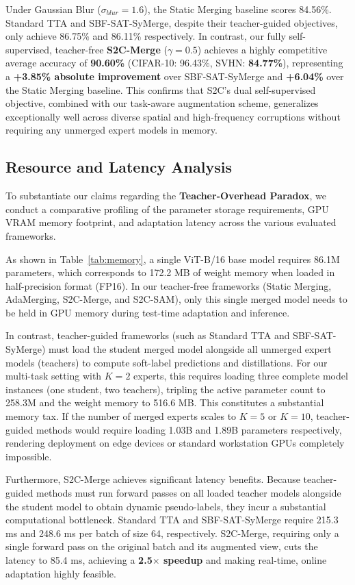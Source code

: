 \documentclass{article}
\theoremstyle{plain}
\theoremstyle{definition}
\theoremstyle{remark}
\begin{document}
Under Gaussian Blur ($\sigma_{blur}=1.6$), the Static Merging baseline scores 84.56\%. Standard TTA and SBF-SAT-SyMerge, despite their teacher-guided objectives, only achieve 86.75\% and 86.11\% respectively. In contrast, our fully self-supervised, teacher-free \textbf{S2C-Merge} ($\gamma=0.5$) achieves a highly competitive average accuracy of \textbf{90.60\%} (CIFAR-10: 96.43\%, SVHN: \textbf{84.77\%}), representing a \textbf{+3.85\% absolute improvement} over SBF-SAT-SyMerge and \textbf{+6.04\%} over the Static Merging baseline. This confirms that S2C's dual self-supervised objective, combined with our task-aware augmentation scheme, generalizes exceptionally well across diverse spatial and high-frequency corruptions without requiring any unmerged expert models in memory.

\vspace{-4pt}
\subsection{Resource and Latency Analysis}
To substantiate our claims regarding the \textbf{Teacher-Overhead Paradox}, we conduct a comparative profiling of the parameter storage requirements, GPU VRAM memory footprint, and adaptation latency across the various evaluated frameworks.

As shown in Table~\ref{tab:memory}, a single ViT-B/16 base model requires 86.1M parameters, which corresponds to 172.2 MB of weight memory when loaded in half-precision format (FP16). In our teacher-free frameworks (Static Merging, AdaMerging, S2C-Merge, and S2C-SAM), only this single merged model needs to be held in GPU memory during test-time adaptation and inference. 

In contrast, teacher-guided frameworks (such as Standard TTA and SBF-SAT-SyMerge) must load the student merged model alongside all unmerged expert models (teachers) to compute soft-label predictions and distillations. For our multi-task setting with $K=2$ experts, this requires loading three complete model instances (one student, two teachers), tripling the active parameter count to 258.3M and the weight memory to 516.6 MB. This constitutes a substantial memory tax. If the number of merged experts scales to $K=5$ or $K=10$, teacher-guided methods would require loading 1.03B and 1.89B parameters respectively, rendering deployment on edge devices or standard workstation GPUs completely impossible.

Furthermore, S2C-Merge achieves significant latency benefits. Because teacher-guided methods must run forward passes on all loaded teacher models alongside the student model to obtain dynamic pseudo-labels, they incur a substantial computational bottleneck. Standard TTA and SBF-SAT-SyMerge require 215.3 ms and 248.6 ms per batch of size 64, respectively. S2C-Merge, requiring only a single forward pass on the original batch and its augmented view, cuts the latency to 85.4 ms, achieving a \textbf{2.5$\times$ speedup} and making real-time, online adaptation highly feasible.
\end{document}
